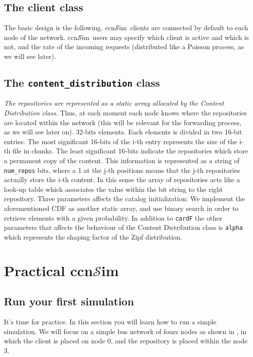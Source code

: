 \documentclass{article}
\newcommand{\ccnsim}{ccn$\mathcal{S}$im}
\begin{document}
\subsection{The client class}
The basic design is the following. \ccnsim\ clients are connected by default to each node of the network. \ccnsim\ users may specify which client is active and which is not, and the rate of the incoming requests (distributed like a Poisson process, as we will see later). 
\subsection{The \texttt{content\_distribution} class}
	\emph{The repositories are represented as a static array allocated by the Content Distribution class}. Thus, at each moment each node knows where the repositories are located within the network (this will be relevant for the forwarding process, as we will see later on).
32-bits elements. Each elements is divided in two 16-bit entries. The most significant 16-bits of the i-th entry represents the size of the i-th file in chunks. The least significant 16-bits indicate the repositories which store a permanent copy of the content. This information is represented as  a string of \verb|num_repos| bits, where a 1 at the j-th positions means that the j-th repositories actually store the i-th content. In this sense the array of repositories acts like a look-up table which associates the value within the bit string to the right repository. Three parameters affects the catalog initialization:
We implement the aforementioned CDF as another static array, and use binary search in order to retrieve elements with a given probability. In addition to \verb|cardF| the other parameters that affects the behaviour of the Content Distribution class is \verb|alpha| which represents the shaping factor of the Zipf distribution. 

\section{Practical \ccnsim}\label{sec:practice}\label{sec:practice}
\subsection{Run your first simulation}
It's time for practice. In this section you will learn how to run a simple simulation. We will focus on a simple bus network of fours nodes as shown in , in which the client is placed on node 0, and the repository is placed within the node 3.
\end{document}
